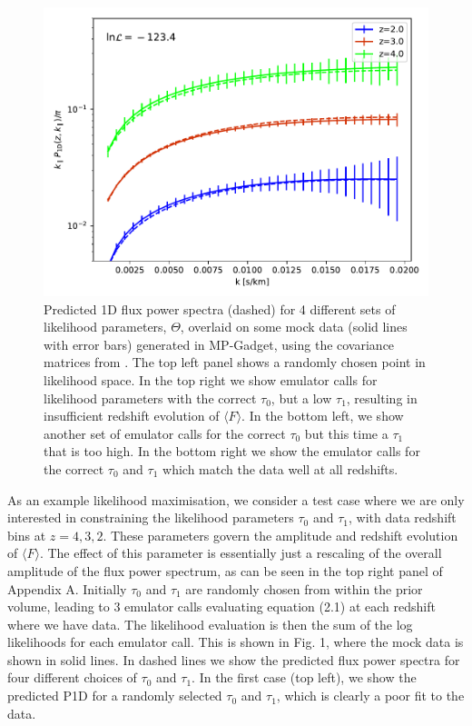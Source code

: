 \documentclass[]{article}
\begin{document}
\begin{figure}[h]
    \includegraphics[scale=0.4]{Figures/goodFit.pdf}
    \caption{Predicted 1D flux power spectra (dashed) for 4 different sets of likelihood
    parameters, $\Theta$, overlaid on some mock data (solid lines with error bars) generated
    in MP-Gadget, using the covariance matrices from \cite{PD2013}.
    The top left panel shows a randomly chosen point in likelihood space. In the top
    right we show emulator calls for likelihood parameters with the correct $\tau_0$,
    but a low $\tau_1$, resulting in insufficient redshift evolution of $\langle F\rangle$.
    In the bottom left, we show another set of emulator calls for the correct $\tau_0$
    but this time a $\tau_1$ that is too high. In the bottom right we show the emulator
    calls for the correct $\tau_0$ and $\tau_1$ which match the data well at all redshifts.}
\end{figure}

As an example likelihood maximisation, we consider a test case where we are only interested 
in constraining the likelihood parameters $\tau_0$ and $\tau_1$, with data redshift bins 
at $z=4,3,2$. These parameters govern the amplitude and redshift evolution of $\langle F\rangle$.
The effect of this parameter is essentially just a rescaling of the overall amplitude of the flux
power spectrum, as can be seen in the top right panel of Appendix A.
Initially $\tau_0$ and $\tau_1$ are randomly chosen from within the prior 
volume, leading to 3 emulator calls evaluating equation (2.1) at each redshift where we 
have data. The likelihood evaluation is then the sum of the log likelihoods for each 
emulator call. This is shown in Fig. 1, where the mock data is shown in solid lines.
In dashed lines we show the predicted flux power spectra for four different choices of
$\tau_0$ and $\tau_1$. In the first case (top left), we show the predicted P1D for a randomly selected
$\tau_0$ and $\tau_1$, which is clearly a poor fit to the data.
\end{document}
